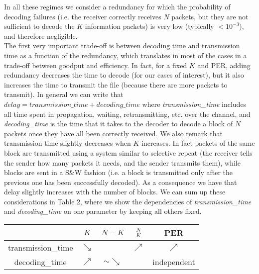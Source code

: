In all these regimes we consider a redundancy for which the probability of decoding failures (i.e. the receiver correctly receives $N$ packets, but they are not sufficient to decode the $K$ information packets) is very low (typically $<10^{-3}$), and therefore negligible. \\
The first very important trade-off is between decoding time and transmission time as a function of the redundancy, which translates in most of the cases in a trade-off between goodput and efficiency. In fact, for a fixed $K$ and PER, adding redundancy decreases the time to decode (for our cases of interest), but it also increases the time to transmit the file (because there are more packets to transmit). In general we can write that $delay=transmission\_time+decoding\_time$ where \emph{transmission\_time} includes all time spent in propagation, waiting, retransmitting, etc. over the channel, and \emph{decoding\_time} is the time that it takes to the decoder to decode a block of $N$ packets once they have all been correctly received. We also remark that transmission time slightly decreases when $K$ increases. In fact packets of the same block are transmitted using a system similar to selective repeat (the receiver tells the sender how many packets it needs, and the sender transmits them), while blocks are sent in a S\&W fashion (i.e. a block is transmitted only after the previous one has been successfully decoded). As a consequence we have that delay slightly increases with the number of blocks. We can sum up these considerations in Table 2, where we show the dependencies of \emph{transmission\_time} and \emph{decoding\_time} on one parameter by keeping all others fixed.
\begin{center}
\begin{tabular}{c|c|c|c|c}

\toprule
&$K$&$N-K$&$\frac{N}{K}$&PER\\
\midrule
transmission\_time&$\searrow$& & $\nearrow$&$\nearrow$\\ \hline
decoding\_time&$\nearrow$&$\sim \searrow$&&independent\\ 
\bottomrule
\end{tabular}
\end{center}

